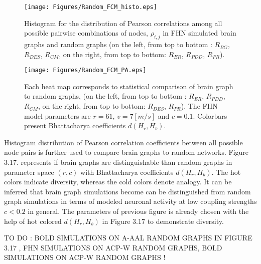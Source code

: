 \begin{figure}[htbp]
 
  \centering
	 \texttt{[image: Figures/Random\_FCM\_histo.eps]}
  \caption[Histogram Comparison, FCM]{Histogram for the distribution of Pearson correlations among all possible pairwise combinations of nodes, $\rho_{i,j}$ in FHN simulated brain graphs and random graphs (on the left, from top to bottom : $R_{BG}$, $R_{DES}$, $R_{CM}$, on the right, from top to bottom: $R_{ER}$, $R_{PDD}$, $R_{PR}$). } 
    \label{fig:Histogram Comparison, FCM}
 	
\end{figure}  

\begin{figure}[htbp]
 
  \centering
	 \texttt{[image: Figures/Random\_FCM\_PA.eps]}
  \caption[Random Graph Comparison, FCM]{Each heat map corresponds to statistical comparison of brain graph to random graphs, (on the left, from top to bottom : $R_{ER}$, $R_{PDD}$, $R_{CM}$, on the right, from top to bottom: $R_{DES}$, $R_{PR}$). The FHN model parameters are $r=61$, $v=7[m/s]$ and $c=0.1$. Colorbars present Bhattacharya coefficients $d(H_r, H_b)$. } 
    \label{fig:Random Graph Comparison, FCM}
 	
\end{figure}  

Histogram distribution of Pearson correlation coefficients between all possible node pairs is further used to compare brain graphs to random networks. Figure 3.17. represents if brain graphs are distinguishable than random graphs in parameter space $(r,c)$ with Bhattacharya coefficients $d(H_r, H_b)$. The hot colors indicate diversity, whereas the cold colors denote analogy. It can be inferred that brain graph simulations become can be distinguished from random graph simulations in terms of modeled neuronal activity at low coupling strengths $c<0.2$ in general.   The parameters of previous figure is already chosen with the help of hot colored $d(H_r, H_b)$ in Figure 3.17 to demonstrate diversity.


TO DO : BOLD SIMULATIONS ON A-AAL RANDOM GRAPHS IN FIGURE 3.17 , FHN SIMULATIONS ON ACP-W RANDOM GRAPHS, BOLD SIMULATIONS ON ACP-W RANDOM GRAPHS !



